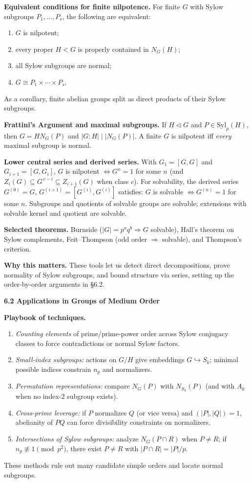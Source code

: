 \documentclass[12pt]{article}
\theoremstyle{definition}
\begin{document}
\textbf{Equivalent conditions for finite nilpotence.}
For finite $G$ with Sylow subgroups $P_1,\dots,P_s$, the following are equivalent:
\begin{enumerate}\itemsep2pt
\item $G$ is nilpotent;
\item every proper $H<G$ is properly contained in $N_G(H)$;
\item all Sylow subgroups are normal;
\item $G\cong P_1\times\cdots\times P_s$.
\end{enumerate}
As a corollary, finite abelian groups split as direct products of their Sylow subgroups.

\textbf{Frattini’s Argument and maximal subgroups.}
If $H\lhd G$ and $P\in\mathrm{Syl}_p(H)$, then $G=HN_G(P)$ and $|G:H|\mid |N_G(P)|$. A finite $G$ is nilpotent iff \emph{every} maximal subgroup is normal.

\textbf{Lower central series and derived series.}
With $G_1=[G,G]$ and $G_{i+1}=[G,G_i]$, $G$ is nilpotent $\iff G^n=1$ for some $n$ (and $Z_i(G)\subseteq G^{\,c-i}\subseteq Z_{i+1}(G)$ when class $c$). For solvability, the derived series $G^{(0)}=G$, $G^{(i+1)}=[G^{(i)},G^{(i)}]$ satisfies: $G$ is solvable $\iff G^{(n)}=1$ for some $n$. Subgroups and quotients of solvable groups are solvable; extensions with solvable kernel and quotient are solvable.

\textbf{Selected theorems.}
Burnside ($|G|=p^aq^b\Rightarrow G$ solvable), Hall’s theorem on Sylow complements, Feit–Thompson (odd order $\Rightarrow$ solvable), and Thompson’s criterion.

\medskip
\noindent\textbf{Why this matters.} These tools let us detect direct decompositions, prove normality of Sylow subgroups, and bound structure via series, setting up the order-by-order arguments in \S6.2.

\newpage
\textbf{6.2 \; Applications in Groups of Medium Order}
\newpage

\textbf{Playbook of techniques.}
\begin{enumerate}\itemsep3pt
\item \textit{Counting elements} of prime/prime-power order across Sylow conjugacy classes to force contradictions or normal Sylow factors.  
\item \textit{Small-index subgroups:} actions on $G/H$ give embeddings $G\hookrightarrow S_k$; minimal possible indices constrain $n_p$ and normalizers.  
\item \textit{Permutation representations:} compare $N_G(P)$ with $N_{S_k}(P)$ (and with $A_k$ when no index-$2$ subgroup exists).  
\item \textit{Cross-prime leverage:} if $P$ normalizes $Q$ (or vice versa) and $(|P|,|Q|)=1$, abelianity of $PQ$ can force divisibility constraints on normalizers.  
\item \textit{Intersections of Sylow subgroups:} analyze $N_G(P\cap R)$ when $P\ne R$; if $n_p\not\equiv1\pmod{p^2}$, there exist $P\neq R$ with $|P\cap R|=|P|/p$.  
\end{enumerate}
These methods rule out many candidate simple orders and locate normal subgroups.
\end{document}
